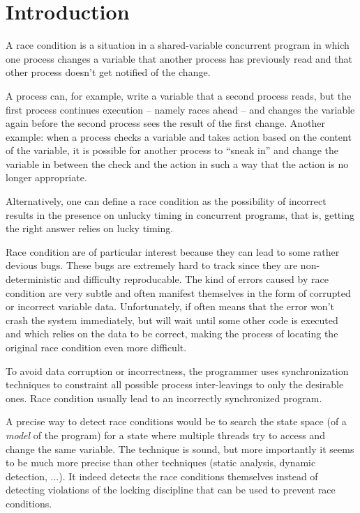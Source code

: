 \section{Introduction}

A race condition is a situation in a shared-variable concurrent
program in which one process changes a variable that another process
has previously read and that other process doesn't get notified of the
change.

A process can, for example, write a variable that a second process
reads, but the first process continues execution -- namely races ahead
-- and changes the variable again before the second process sees the
result of the first change. Another example: when a process checks a
variable and takes action based on the content of the variable, it is
possible for another process to ``sneak in'' and change the variable
in between the check and the action in such a way that the action is
no longer appropriate.

Alternatively, one can define a race condition as the possibility of
incorrect results in the presence on unlucky timing in concurrent
programs, that is, getting the right answer relies on lucky timing.

\bigskip%
Race condition are of particular interest because they can lead to
some rather devious bugs. These bugs are extremely hard to track since
they are non-deterministic and difficulty reproducable. The kind of
errors caused by race condition are very subtle and often manifest
themselves in the form of corrupted or incorrect variable
data. Unfortunately, if often means that the error won't crash the
system immediately, but will wait until some other code is executed
and which relies on the data to be correct, making the process of
locating the original race condition even more difficult.

To avoid data corruption or incorrectness, the programmer uses
synchronization techniques to constraint all possible process
inter-leavings to only the desirable ones. Race condition usually
lead to an incorrectly synchronized program.

A precise way to detect race conditions would be to search the state
space (of a \emph{model} of the program) for a state where multiple
threads try to access and change the same variable.  The technique is
sound, but more importantly it seems to be much more precise than
other techniques (static analysis, dynamic detection, ...). It indeed
detects the race conditions themselves instead of detecting violations
of the locking discipline that can be used to prevent race conditions.
